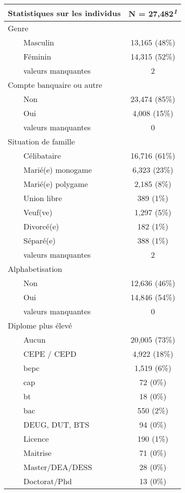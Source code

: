 \documentclass[
]{article}
\begin{document}
\begin{table}[!t]
\fontsize{12.0pt}{14.4pt}\selectfont
\begin{tabular*}{\linewidth}{@{\extracolsep{\fill}}lc}
\toprule
Statistiques sur les individus & \textbf{N = 27,482}\textsuperscript{\textit{1}} \\ 
\midrule\addlinespace[2.5pt]
Genre &  \\ 
    Masculin & 13,165 (48\%) \\ 
    Féminin & 14,315 (52\%) \\ 
    valeurs manquantes & 2 \\ 
Compte banquaire ou autre &  \\ 
    Non & 23,474 (85\%) \\ 
    Oui & 4,008 (15\%) \\ 
    valeurs manquantes & 0 \\ 
Situation de famille &  \\ 
    Célibataire & 16,716 (61\%) \\ 
    Marié(e) monogame & 6,323 (23\%) \\ 
    Marié(e) polygame & 2,185 (8\%) \\ 
    Union libre & 389 (1\%) \\ 
    Veuf(ve) & 1,297 (5\%) \\ 
    Divorcé(e) & 182 (1\%) \\ 
    Séparé(e) & 388 (1\%) \\ 
    valeurs manquantes & 2 \\ 
Alphabetisation &  \\ 
    Non & 12,636 (46\%) \\ 
    Oui & 14,846 (54\%) \\ 
    valeurs manquantes & 0 \\ 
Diplome plus élevé &  \\ 
    Aucun & 20,005 (73\%) \\ 
    CEPE / CEPD & 4,922 (18\%) \\ 
    bepc & 1,519 (6\%) \\ 
    cap & 72 (0\%) \\ 
    bt & 18 (0\%) \\ 
    bac & 550 (2\%) \\ 
    DEUG, DUT, BTS & 94 (0\%) \\ 
    Licence & 190 (1\%) \\ 
    Maitrise & 71 (0\%) \\ 
    Master/DEA/DESS & 28 (0\%) \\ 
    Doctorat/Phd & 13 (0\%) \\ 

\end{tabular*}
\end{table}
\end{document}
